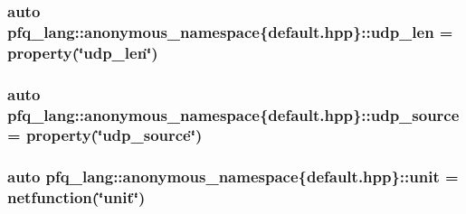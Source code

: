 \hypertarget{namespacepfq__lang_1_1anonymous__namespace_02default_8hpp_03_ab0dcf23db0f218100e7fe51562e0add1}{
\subsubsection[{udp\-\_\-len}]{\setlength{\rightskip}{0pt plus 5cm}auto pfq\-\_\-lang\-::anonymous\-\_\-namespace\{default.\-hpp\}\-::udp\-\_\-len = {\bf property}(\char`\"{}udp\-\_\-len\char`\"{})}}\label{namespacepfq__lang_1_1anonymous__namespace_02default_8hpp_03_ab0dcf23db0f218100e7fe51562e0add1}
\hypertarget{namespacepfq__lang_1_1anonymous__namespace_02default_8hpp_03_a7d2943522cfb795fcb82c894dba83292}{
\subsubsection[{udp\-\_\-source}]{\setlength{\rightskip}{0pt plus 5cm}auto pfq\-\_\-lang\-::anonymous\-\_\-namespace\{default.\-hpp\}\-::udp\-\_\-source = {\bf property}(\char`\"{}udp\-\_\-source\char`\"{})}}\label{namespacepfq__lang_1_1anonymous__namespace_02default_8hpp_03_a7d2943522cfb795fcb82c894dba83292}
\hypertarget{namespacepfq__lang_1_1anonymous__namespace_02default_8hpp_03_ae78caafebdc64f9180032a049b7c3b3a}{
\subsubsection[{unit}]{\setlength{\rightskip}{0pt plus 5cm}auto pfq\-\_\-lang\-::anonymous\-\_\-namespace\{default.\-hpp\}\-::unit = {\bf netfunction}(\char`\"{}unit\char`\"{})}}\label{namespacepfq__lang_1_1anonymous__namespace_02default_8hpp_03_ae78caafebdc64f9180032a049b7c3b3a}
